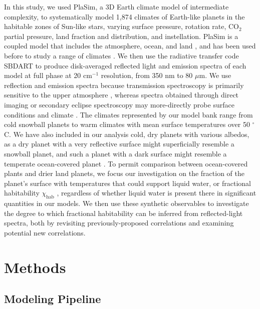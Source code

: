 \documentclass[fleqn,usenatbib]{mnras}
\begin{document}
In this study, we used PlaSim, a 3D Earth climate model of intermediate complexity, to systematically model 1,874 climates of Earth-like planets in the habitable zones of Sun-like stars, varying surface pressure, rotation rate, CO$_2$ partial pressure, land fraction and distribution, and instellation. PlaSim is a coupled model that includes the atmosphere, ocean, and land \citep{Fraedrich2005}, and has been used before to study a range of climates \citep[e.g.][]{Lucarini2013,Paradise2017,Checlair2017}. We then use the radiative transfer code SBDART \citep{disort,Ricchiazzi1998,modtran} to produce disk-averaged reflected light and emission spectra of each model at full phase at 20 cm$^{-1}$ resolution, from 350 nm to 80 $\mu$m. We use reflection and emission spectra because transmission spectroscopy is primarily sensitive to the upper atmosphere \citep{Kreidberg2018,hightransmission1,hightransmission2}, whereas spectra obtained through direct imaging or secondary eclipse spectroscopy may more-directly probe surface conditions and climate \citep{Richardson2007,Swain2008}. The climates represented by our model bank range from cold snowball planets to warm climates with mean surface temperatures over 50 $^\circ$C. We have also included in our analysis cold, dry planets with various albedos, as a dry planet with a very reflective surface might superficially resemble a snowball planet, and such a planet with a dark surface might resemble a temperate ocean-covered planet \citep{Rushby2020}. To permit comparison between ocean-covered plants and drier land planets, we focus our investigation on the fraction of the planet's surface with temperatures that could support liquid water, or fractional habitability $\chi_\text{hab}$ \citep{Spiegel2008}, regardless of whether liquid water is present there in significant quantities in our models. We then use these synthetic observables to investigate the degree to which fractional habitability can be inferred from reflected-light spectra, both by revisiting previously-proposed correlations and examining potential new correlations.

\section{Methods}\label{obsec:methods}
\subsection{Modeling Pipeline}
\end{document}
